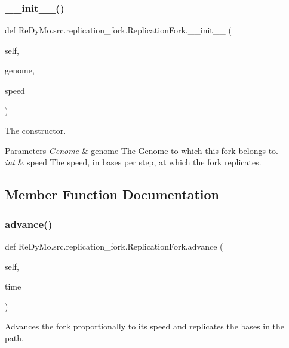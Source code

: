 \subsubsection{\texorpdfstring{\+\_\+\+\_\+init\+\_\+\+\_\+()}{\_\_init\_\_()}}
{\footnotesize\ttfamily def Re\+Dy\+Mo.\+src.\+replication\+\_\+fork.\+Replication\+Fork.\+\_\+\+\_\+init\+\_\+\+\_\+ (\begin{DoxyParamCaption}\item[{}]{self,  }\item[{}]{genome,  }\item[{}]{speed }\end{DoxyParamCaption})}



The constructor. 


\begin{DoxyParams}{Parameters}
{\em Genome} & genome The Genome to which this fork belongs to. \\
\hline
{\em int} & speed The speed, in bases per step, at which the fork replicates. \\
\hline
\end{DoxyParams}


\subsection{Member Function Documentation}
\mbox{\label{classReDyMo_1_1src_1_1replication__fork_1_1ReplicationFork_acda54ba4aba3f2a9c02036626e20aa73}} 
\subsubsection{\texorpdfstring{advance()}{advance()}}
{\footnotesize\ttfamily def Re\+Dy\+Mo.\+src.\+replication\+\_\+fork.\+Replication\+Fork.\+advance (\begin{DoxyParamCaption}\item[{}]{self,  }\item[{}]{time }\end{DoxyParamCaption})}



Advances the fork proportionally to its speed and replicates the bases in the path. 



